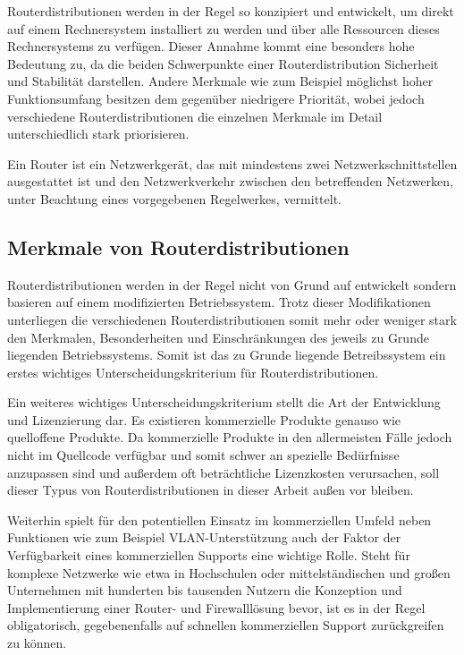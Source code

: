 \documentclass[a4paper,12pt]{scrartcl}
\begin{document}
Routerdistributionen werden in der Regel so konzipiert und entwickelt,
um direkt auf einem Rechnersystem installiert zu werden und über alle Ressourcen
dieses Rechnersystems zu verfügen. Dieser Annahme kommt eine besonders hohe
Bedeutung zu, da die beiden Schwerpunkte einer Routerdistribution Sicherheit und
Stabilität darstellen. Andere Merkmale wie zum Beispiel m\"oglichst hoher
Funktionsumfang besitzen dem gegen\"uber niedrigere Priorit\"at, wobei jedoch
verschiedene Routerdistributionen die einzelnen Merkmale im
Detail unterschiedlich stark priorisieren.

Ein Router ist ein Netzwerkgerät, das mit mindestens zwei
Netzwerkschnittstellen ausgestattet ist und den Netzwerkverkehr zwischen den
betreffenden Netzwerken, unter Beachtung eines vorgegebenen Regelwerkes,
vermittelt.

\subsection{Merkmale von Routerdistributionen}
Routerdistributionen werden in der Regel nicht von Grund auf entwickelt sondern
basieren auf einem modifizierten Betriebssystem. Trotz dieser Modifikationen
unterliegen die verschiedenen Routerdistributionen somit mehr oder weniger
stark den Merkmalen, Besonderheiten und Einschr\"ankungen des jeweils zu Grunde
liegenden Betriebssystems. Somit ist das zu Grunde liegende Betreibssystem ein
erstes wichtiges Unterscheidungskriterium f\"ur Routerdistributionen.

Ein weiteres wichtiges Unterscheidungskriterium stellt die Art der Entwicklung
und Lizenzierung dar. Es existieren kommerzielle Produkte genauso wie
quelloffene Produkte. Da kommerzielle Produkte in den allermeisten F\"alle
jedoch nicht im Quellcode verf\"ugbar und somit schwer an spezielle
Bed\"urfnisse anzupassen sind und au\ss{}erdem oft betr\"achtliche Lizenzkosten
verursachen, soll dieser Typus von Routerdistributionen in dieser Arbeit
au\ss{}en vor bleiben. 
 
Weiterhin spielt f\"ur den potentiellen Einsatz im kommerziellen Umfeld
neben Funktionen wie zum Beispiel VLAN-Unterst\"utzung auch der Faktor der
Verf\"ugbarkeit eines kommerziellen Supports eine wichtige Rolle. Steht f\"ur
komplexe Netzwerke wie etwa in Hochschulen oder mittelst\"andischen und
gro\ss{}en Unternehmen mit hunderten bis tausenden Nutzern die Konzeption und
Implementierung einer Router- und Firewalll\"osung bevor, ist es in der Regel
obligatorisch, gegebenenfalls auf schnellen kommerziellen Support
zur\"uckgreifen zu k\"onnen.
\end{document}
